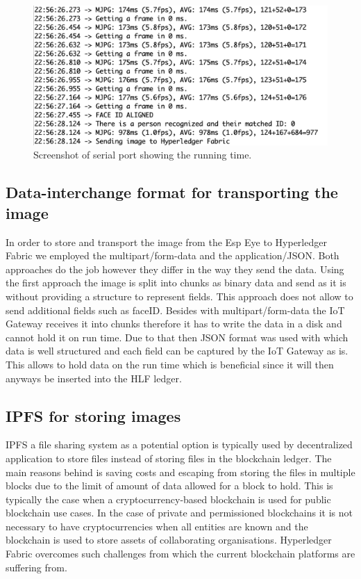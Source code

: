 \begin{figure}[!htb]
    \centering
    \includegraphics[width=1\textwidth]{figures/time_facedetection.png}
    \caption{Screenshot of serial port showing the running time.}
    \label{fig:time_face}
\end{figure}




\subsection{Data-interchange format for transporting the image }

In order to store and transport the image from the Esp Eye to Hyperledger Fabric we employed the multipart/form-data and the application/JSON. Both approaches do the job however they differ in the way they send the data. Using the first approach the image is split into chunks as binary data and send as it is without providing a structure to represent fields. This approach does not allow to send additional fields such as faceID. Besides with multipart/form-data the IoT Gateway receives it into chunks therefore it has to write the data in a disk and cannot hold it on run time. Due to that then JSON format was used with which data is well structured and each field can be captured by the IoT Gateway as is. This allows to hold data on the run time which is beneficial since it will then anyways be inserted into the HLF ledger.  

\subsection{IPFS for storing images}

IPFS a file sharing system as a potential option is typically used by decentralized application to store files instead of storing files in the blockchain ledger. The main reasons behind is saving costs and escaping from storing the files in multiple blocks due to the limit of amount of data allowed for a block to hold.  This is typically the case when a cryptocurrency-based blockchain is used for public blockchain use cases. In the case of private and permissioned blockchains it is not necessary to have cryptocurrencies when all entities are known and the blockchain is used to store assets of collaborating organisations. Hyperledger Fabric overcomes such challenges from which the current blockchain platforms are suffering from. 


